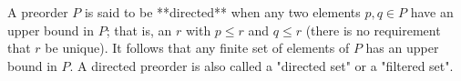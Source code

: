 A preorder $P$ is said to be **directed** when any two elements $p, q \in P$ have an upper bound in $P$; that is, an $r$ with $p \leq r$ and $q \leq r$ (there is no requirement that $r$ be unique). It follows that any finite set of elements of $P$ has an upper bound in $P$. A directed preorder is also called a "directed set" or a "filtered set".
